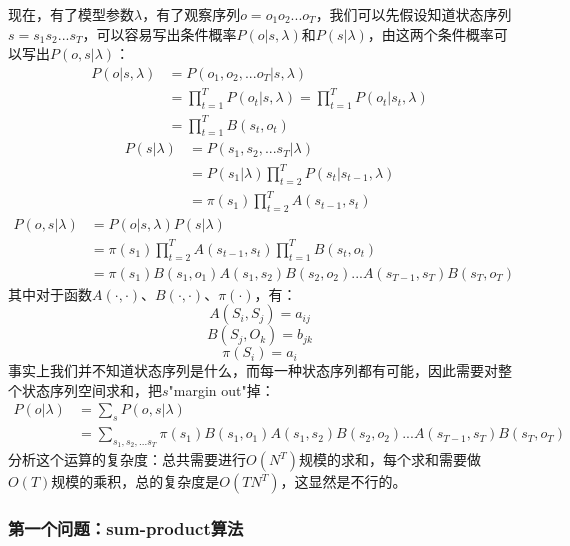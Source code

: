 \documentclass[11pt,a4paper]{article}
\begin{document}
现在，有了模型参数$\lambda$，有了观察序列$o=o_1 o_2 ... o_T$，我们可以先假设知道状态序列$s=s_1 s_2 ... s_T$，可以容易写出条件概率$P(o | s, \lambda)$和$P(s | \lambda)$，由这两个条件概率可以写出$P(o, s | \lambda)$：
\begin{equation}\begin{split}
P(o | s, \lambda)
& = P(o_1, o_2, ... o_T | s, \lambda)\\
& = \prod_{t = 1}^T P(o_t | s, \lambda) = \prod_{t = 1}^T P(o_t | s_t, \lambda)\\
& = \prod_{t = 1}^T B(s_t, o_t)
\end{split}\end{equation}
\begin{equation}\begin{split}
P(s | \lambda)
& = P(s_1, s_2, ... s_T | \lambda)\\
& = P(s_1 | \lambda) \prod_{t = 2}^T P(s_t | s_{t - 1}, \lambda)\\
& = \pi(s_1) \prod_{t = 2}^T A(s_{t - 1}, s_t)
\end{split}\end{equation}
\begin{equation}\begin{split}
P(o, s | \lambda)
& = P(o | s, \lambda) P(s | \lambda)\\
& = \pi(s_1) \prod_{t = 2}^T A(s_{t - 1}, s_t) \prod_{t = 1}^T B(s_t, o_t)\\
& = \pi(s_1) B(s_1, o_1) A(s_1, s_2) B(s_2, o_2) ... A(s_{T - 1}, s_T) B(s_T, o_T)
\end{split}\end{equation}
其中对于函数$A(\cdot, \cdot)$、$B(\cdot, \cdot)$、$\pi(\cdot)$，有：
$$ A(S_i, S_j) = a_{ij} $$
$$ B(S_j, O_k) = b_{jk} $$
$$ \pi(S_i) = a_{i} $$
事实上我们并不知道状态序列是什么，而每一种状态序列都有可能，因此需要对整个状态序列空间求和，把$s$"margin out"掉：
\begin{equation}\begin{split}
P(o | \lambda)
& = \sum_s P(o, s | \lambda)\\
& = \sum_{s_1, s_2, ... s_T} \pi(s_1) B(s_1, o_1) A(s_1, s_2) B(s_2, o_2) ... A(s_{T - 1}, s_T) B(s_T, o_T)
\end{split}\end{equation}
分析这个运算的复杂度：总共需要进行$O(N^T)$规模的求和，每个求和需要做$O(T)$规模的乘积，总的复杂度是$O(TN^T)$，这显然是不行的。

\subsubsection{第一个问题：sum-product算法}
\end{document}
